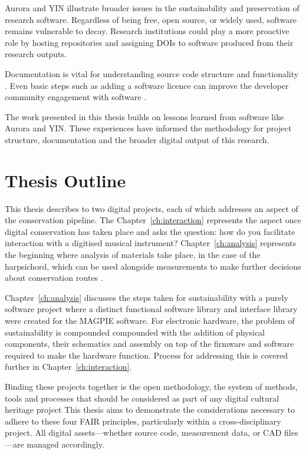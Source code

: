 Aurora and YIN illustrate broader issues in the sustainability and preservation
of research software. Regardless of being free, open source, or widely used,
software remains vulnerable to decay. Research institutions could play a more
proactive role by hosting repositories and assigning DOIs to software produced
from their research outputs.

Documentation is vital for understanding source code structure and functionality
\cite{perkel_challenge_2020}.  Even basic steps such as adding a software
licence can improve the developer community engagement with software
\cite{colazo_licence_2009}.

The work presented in this thesis builds on lessons learned from software like
Aurora and YIN. These experiences have informed the methodology for project
structure, documentation and the broader digital output of this research. 







\section{Thesis Outline}

This thesis describes to two digital projects, each of which addresses an aspect
of the conservation pipeline. The Chapter~\ref{ch:interaction} represents the
aspect once digital conservation has taken place and asks the question: how do
you facilitate interaction with a digitised musical instrument?
Chapter~\ref{ch:analysis} represents the beginning where analysis of materials
take place, in the case of the harpsichord, which can be used alongside
measurements to make further decisions about conservation routes
\cite{barclay_care_1997}.

Chapter~\ref{ch:analysis} discusses the steps taken for sustainability with a
purely software project where a distinct functional software library and
interface library were created for the MAGPIE software.  For electronic
hardware, the problem of sustainability is compounded compounded with the
addition of physical components, their schematics and assembly on top of the
firmware and software required to make the hardware function. Process for
addressing this is covered further in Chapter~\ref{ch:interaction}.

Binding these projects together is the open methodology, the system of methods,
tools and processes that should be considered as part of any digital cultural
heritage project This thesis aims to demonstrate the considerations necessary to
adhere to these four FAIR principles, particularly within a cross-disciplinary
project. All digital assets—whether source code, measurement data, or CAD
files—are managed accordingly.

